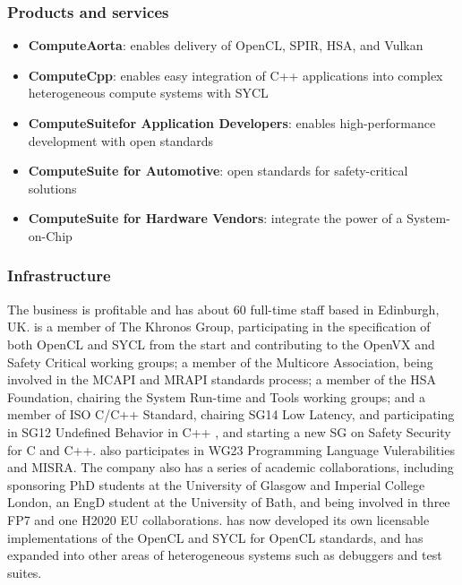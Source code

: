 \documentclass[a4paper,11pt]{article}
\begin{document}
\subsubsection*{Products and services}

\begin{itemize}
\item
\textbf{ComputeAorta}: enables delivery of OpenCL, SPIR, HSA, and Vulkan
\item
\textbf{ComputeCpp}: enables easy integration of C++ applications into complex heterogeneous compute systems with SYCL
\item
\textbf{ComputeSuitefor Application Developers}: enables high-performance development with open standards
\item
\textbf{ComputeSuite for Automotive}: open standards for safety-critical solutions
\item
\textbf{ComputeSuite for Hardware Vendors}: integrate the power of a System-on-Chip
\end{itemize}


\subsubsection*{Infrastructure}
The \CODEPLAYlong{} business is profitable and has about 60 full-time staff
based in Edinburgh, UK. \CODEPLAYshort{} is a member of The Khronos Group,
participating in the specification of both OpenCL and SYCL from the start
and contributing to the OpenVX and Safety Critical working groups; a
member of the Multicore Association, being involved in the MCAPI and
MRAPI standards process; a member of the HSA Foundation, chairing the
System Run-time and Tools working groups; and a member of ISO C/C++
Standard, chairing SG14 Low Latency, and participating in SG12 Undefined
Behavior in C++ , and starting a new SG on Safety Security for C and
C++. \CODEPLAYlong{} also participates in WG23 Programming Language
Vulerabilities and MISRA.  The company also has a series of academic
collaborations, including sponsoring PhD students at the University of
Glasgow and Imperial College London, an EngD student at the University of
Bath, and being involved in three FP7 and one H2020 EU
collaborations. \CODEPLAYshort{} has now developed its own licensable implementations
of the OpenCL and SYCL for OpenCL standards, and has expanded into other
areas of heterogeneous systems such as debuggers and test suites.


\end{document}
